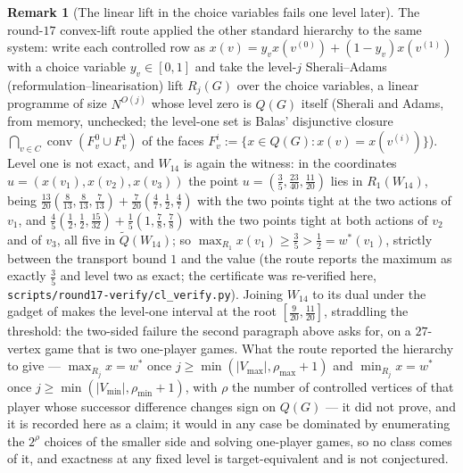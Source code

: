 \documentclass[11pt]{article}
\theoremstyle{plain}
\theoremstyle{definition}
\newtheorem{remark}[theorem]{Remark}
\newcommand{\Vmax}{V_{\max}}
\newcommand{\Vmin}{V_{\min}}
\begin{document}
\begin{remark}[The linear lift in the choice variables fails one level later]\label{rem:choice-lift}
The round-$17$ convex-lift route applied the other standard hierarchy to
the same system: write each controlled row as
$x(v)=y_vx(v^{(0)})+(1-y_v)x(v^{(1)})$ with a choice variable
$y_v\in[0,1]$ and take the level-$j$ Sherali--Adams
(reformulation--linearisation) lift $R_j(G)$ over the choice variables, a
linear programme of size $N^{O(j)}$ whose level zero is $Q(G)$ itself
(Sherali and Adams, from memory, unchecked; the level-one set is Balas'
disjunctive closure $\bigcap_{v\in C}\operatorname{conv}(F_v^{0}\cup F_v^{1})$
of the faces $F_v^{i}:=\{x\in Q(G):x(v)=x(v^{(i)})\}$). Level one is not
exact, and $W_{14}$ is again the witness: in the coordinates
$u=(x(v_1),x(v_2),x(v_3))$ the point
$u=(\tfrac35,\tfrac{23}{40},\tfrac{11}{20})$ lies in $R_1(W_{14})$, being
$\tfrac{13}{20}(\tfrac8{13},\tfrac8{13},\tfrac7{13})+\tfrac7{20}(\tfrac47,\tfrac12,\tfrac47)$
with the two points tight at the two actions of $v_1$, and
$\tfrac45(\tfrac12,\tfrac12,\tfrac{15}{32})+\tfrac15(1,\tfrac78,\tfrac78)$
with the two points tight at both actions of $v_2$ and of $v_3$, all five
in $\tilde Q(W_{14})$; so $\max_{R_1}x(v_1)\ge\tfrac35>\tfrac12=w^\ast(v_1)$,
strictly between the transport bound $1$ and the value (the route reports
the maximum as exactly $\tfrac35$ and level two as exact; the certificate
was re-verified here, \texttt{scripts/round17-verify/cl\_verify.py}).
Joining $W_{14}$ to its dual under the gadget of
 makes the level-one interval at the root
$[\tfrac9{20},\tfrac{11}{20}]$, straddling the threshold: the two-sided
failure the second paragraph above asks for, on a $27$-vertex game that is
two one-player games. What the route reported the hierarchy to give ---
$\max_{R_j}x=w^\ast$ once $j\ge\min(|\Vmax|,\rho_{\max}+1)$ and
$\min_{R_j}x=w^\ast$ once $j\ge\min(|\Vmin|,\rho_{\min}+1)$, with $\rho$ the
number of controlled vertices of that player whose successor difference
changes sign on $Q(G)$ --- it did not prove, and it is recorded here as a
claim; it would in any case be dominated by enumerating the $2^{\rho}$ choices of the smaller side
and solving one-player games, so no class comes of it, and exactness at
any fixed level is target-equivalent and is not conjectured.
\end{remark}
\end{document}

